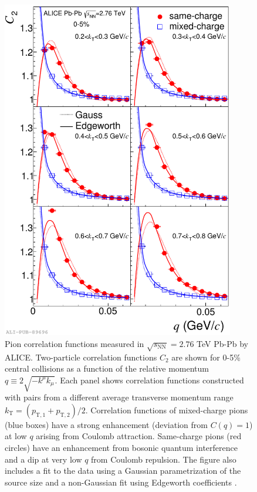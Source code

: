 \begin{figure}[hbtp]
\includegraphics[width=24pc]{Figures/BorrowedFigures/PionCorrelationFunctions.pdf}
\caption[Femtoscopy of same-charge and mixed-charge pions]{
Pion correlation functions measured in $\sqrt{s_\mathrm{NN}} = 2.76$ TeV Pb-Pb by ALICE.
Two-particle correlation functions $C_2$ are shown for 0-5\% central collisions as a function of the relative momentum $q \equiv 2 \sqrt{-k^\mu k_\mu}$.
Each panel shows correlation functions constructed with pairs from a different average transverse momentum range $k_\mathrm{T} = (p_\mathrm{T,1} + p_\mathrm{T,2})/2$. 
Correlation functions of mixed-charge pions (blue boxes) have a strong enhancement (deviation from $C(q) = 1$) at low $q$ arising from Coulomb attraction.
Same-charge pions (red circles) have an enhancement from bosonic quantum interference and a dip at very low $q$ from Coulomb repulsion.
The figure also includes a fit to the data using a Gaussian parametrization of the source size and a non-Gaussian fit using Edgeworth coefficients \cite{Blinnikov:1997jq}.}
\label{fig:PionCorrelationFunctions}
\end{figure}

